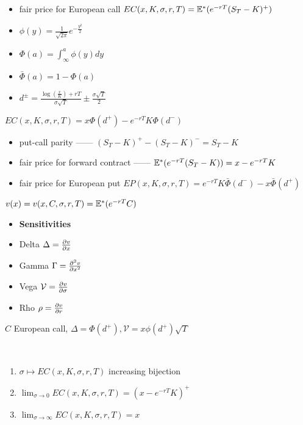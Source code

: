 \begin{itemize}
    \item fair price for European call $EC(x, K, \sigma, r, T) = \mathbb{E}^*(e^{-rT}(S_T - K)^+)$
    \item $\phi(y) = \frac{1}{\sqrt{2\pi}}e^{-\frac{y^2}{2}}$
    \item $\Phi(a) = \int^a_\infty \phi(y) dy$
    \item $\bar\Phi(a) = 1 - \Phi(a)$
    \item $d^{\pm} = \frac{\log(\frac{x}{K}) + rT}{\sigma\sqrt{T}} \pm \frac{\sigma \sqrt{T}}{2}$
\end{itemize}

\begin{prop}
    $EC(x, K, \sigma, r, T) = x\Phi(d^+) - e^{-rT}K\Phi(d^-)$
\end{prop}

\begin{itemize}
    \item put-call parity ------ $(S_T - K)^+ - (S_T - K)^- = S_T - K$
    \item fair price for forward contract ------ $\mathbb{E}^*(e^{-rT}(S_T - K)) = x - e^{-rT}K$
    \item fair price for European put $EP(x, K, \sigma, r, T) = e^{-rT}K\bar\Phi(d^-) - x\bar\Phi(d^+)$
\end{itemize}

\begin{setting}
    $v(x) = v(x, C, \sigma, r, T) = \mathbb{E}^*(e^{-rT}C)$
\end{setting}

\begin{itemize}
    \item \textbf{Sensitivities}
    \item Delta $\Delta = \pdv{v}{x}$
    \item Gamma $\Gamma = \pdv[2]{v}{x}$
    \item Vega $\mathcal{V} = \pdv{v}{\sigma}$
    \item Rho $\rho = \pdv{v}{r}$
\end{itemize}

\begin{example}
    $C$ European call, $\Delta = \Phi(d^+), \mathcal{V} = x\phi(d^+)\sqrt{T}$
\end{example}

\begin{prop}\,
    \begin{enumerate}
        \item $\sigma \mapsto EC(x, K, \sigma, r, T)$ increasing bijection
        \item $\lim_{\sigma \rightarrow 0}EC(x, K, \sigma, r, T) = (x - e^{-rT}K)^+$
        \item $\lim_{\sigma \rightarrow \infty}EC(x, K, \sigma, r, T) = x$
    \end{enumerate}
\end{prop}

